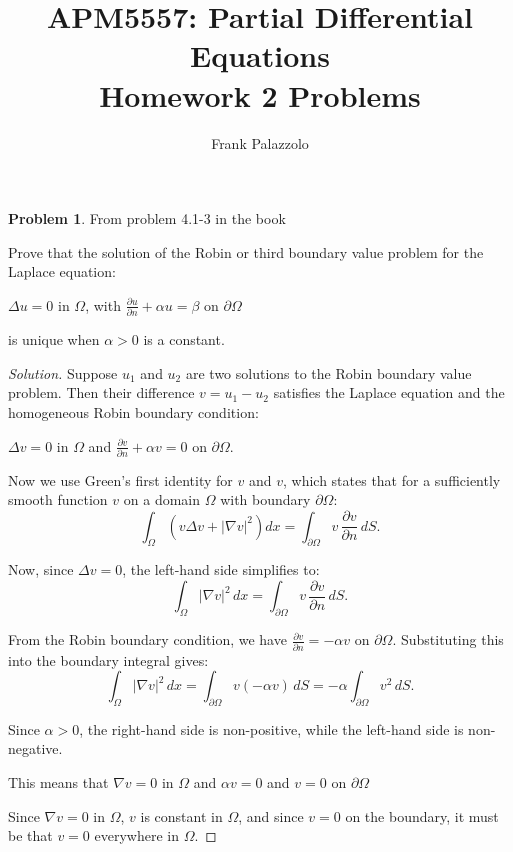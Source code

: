 \documentclass[11pt]{article}
\title{APM5557: Partial Differential Equations\\Homework 2 Problems}
\author{Frank Palazzolo}
\date{}
\newcommand{\pd}[2]{\frac{\partial #1}{\partial #2}}
\newcommand{\lap}{\Delta}
\newcommand{\grad}{\nabla}
\theoremstyle{definition}
\newtheorem{problem}{Problem}
\begin{document}
\maketitle

\begin{problem}
From problem 4.1-3 in the book

Prove that the solution of the Robin or third boundary value problem for the
Laplace equation:

$\lap u = 0$ in $\Omega$, with $\frac{\partial u}{\partial n} + \alpha u = \beta$ on $\partial \Omega$

is unique when $\alpha > 0$ is a constant.
\end{problem}

\begin{proof}[Solution]
Suppose $u_1$ and $u_2$ are two solutions to the Robin boundary value problem. Then their difference $v = u_1 - u_2$ satisfies the Laplace equation and the homogeneous Robin boundary condition:

$\lap v = 0$ in $\Omega$ and $\frac{\partial v}{\partial n} + \alpha v = 0$ on $\partial \Omega$.

Now we use Green's first identity for $v$ and $v$, which states that for a sufficiently smooth function $v$ on a domain $\Omega$ with boundary $\partial \Omega$:
\begin{equation} \label{eq:green-v}
\int_\Omega \left( v \lap v + |\grad v|^2 \right) dx
  = \int_{\partial\Omega} v \, \pd{v}{n} \, dS.
\end{equation}

Now, since $\lap v = 0$, the left-hand side simplifies to:
\begin{equation}
\int_\Omega |\grad v|^2 \, dx = \int_{\partial\Omega} v \, \pd{v}{n} \, dS.
\end{equation}

From the Robin boundary condition, we have $\pd{v}{n} = -\alpha v$ on $\partial \Omega$. Substituting this into the boundary integral gives:
\begin{equation}
\int_\Omega |\grad v|^2 \, dx = \int_{\partial\Omega} v (-\alpha v) \, dS = -\alpha \int_{\partial\Omega} v^2 \, dS.
\end{equation}

Since $\alpha > 0$, the right-hand side is non-positive, while the left-hand side is non-negative. 

This means that $\grad v = 0$ in $\Omega$ and $\alpha v = 0$ and $v = 0$ on $\partial \Omega$

Since $\grad v = 0$ in $\Omega$, $v$ is constant in $\Omega$, and since $v = 0$ on the boundary, it must be that $v = 0$ everywhere in $\Omega$.
\end{proof}
\end{document}
